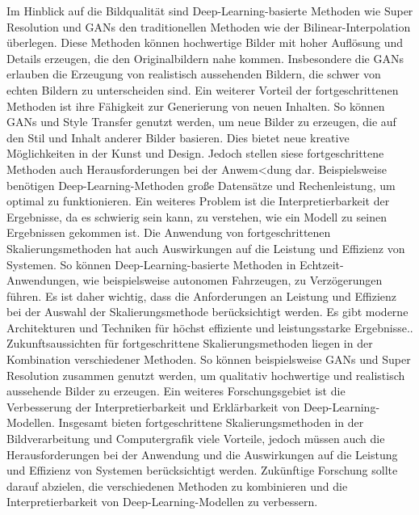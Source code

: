     Im Hinblick auf die Bildqualität sind Deep-Learning-basierte Methoden wie Super Resolution und GANs den traditionellen Methoden wie der Bilinear-Interpolation überlegen.      
    Diese Methoden können hochwertige Bilder mit hoher Auflösung und Details erzeugen, die den Originalbildern nahe kommen.      
    Insbesondere die GANs erlauben die Erzeugung von realistisch aussehenden Bildern, die schwer von echten Bildern zu unterscheiden sind.
    Ein weiterer Vorteil der fortgeschrittenen Methoden ist ihre Fähigkeit zur Generierung von neuen Inhalten.      
    So können GANs und Style Transfer genutzt werden, um neue Bilder zu erzeugen, die auf den Stil und Inhalt anderer Bilder basieren.      
    Dies bietet neue kreative Möglichkeiten in der Kunst und Design.
    Jedoch stellen siese fortgeschrittene Methoden auch Herausforderungen bei der Anwem<dung dar.      
    Beispielsweise benötigen Deep-Learning-Methoden große Datensätze und Rechenleistung, um optimal zu funktionieren.      
    Ein weiteres Problem ist die Interpretierbarkeit der Ergebnisse, da es schwierig sein kann, zu verstehen, wie ein Modell zu seinen Ergebnissen gekommen ist.
    Die Anwendung von fortgeschrittenen Skalierungsmethoden hat auch Auswirkungen auf die Leistung und Effizienz von Systemen.      
    So können Deep-Learning-basierte Methoden in Echtzeit-Anwendungen, wie beispielsweise autonomen Fahrzeugen, zu Verzögerungen führen.      
    Es ist daher wichtig, dass die Anforderungen an Leistung und Effizienz bei der Auswahl der Skalierungsmethode berücksichtigt werden.      
    Es gibt moderne Architekturen und Techniken für höchst effiziente und leistungsstarke Ergebnisse..
    Zukunftsaussichten für fortgeschrittene Skalierungsmethoden liegen in der Kombination verschiedener Methoden.      
    So können beispielsweise GANs und Super Resolution zusammen genutzt werden, um qualitativ hochwertige und realistisch aussehende Bilder zu erzeugen.      
    Ein weiteres Forschungsgebiet ist die Verbesserung der Interpretierbarkeit und Erklärbarkeit von Deep-Learning-Modellen.      
    Insgesamt bieten fortgeschrittene Skalierungsmethoden in der Bildverarbeitung und Computergrafik viele Vorteile, jedoch müssen auch die Herausforderungen bei der Anwendung und die Auswirkungen auf die Leistung und Effizienz von Systemen berücksichtigt werden.      
    Zukünftige Forschung sollte darauf abzielen, die verschiedenen Methoden zu kombinieren und die Interpretierbarkeit von Deep-Learning-Modellen zu verbessern.

\newpage